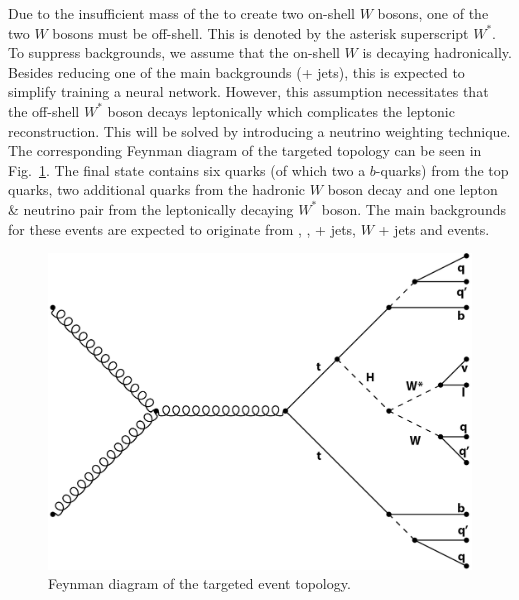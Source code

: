 \documentclass[bachelor,ngerman,english]{GAUBM}
\begin{document}
Due to the insufficient mass of the \Hboson to create two on-shell $W$ bosons, one of the two $W$ bosons must be off-shell. This is denoted by the asterisk superscript $W^*$. To suppress backgrounds, we assume that the on-shell $W$ is decaying hadronically. Besides reducing one of the main backgrounds (\ttbar + jets), this is expected to simplify training a neural network. However, this assumption necessitates that the off-shell $W^*$ boson decays leptonically which complicates the leptonic reconstruction. This will be solved by introducing a neutrino weighting technique.
The corresponding Feynman diagram of the targeted topology can be seen in Fig.~\ref{fig:feynman_tthww}. The final state contains six quarks (of which two a $b$-quarks) from the top quarks, two additional quarks from the hadronic $W$ boson decay and one lepton \& neutrino pair from the leptonically decaying $W^*$ boson. The main backgrounds for these events are expected to originate from \ttZ, \ttW, \ttbar + jets, $W$ + jets and \ttbar\ttbar events.


\begin{figure}[t]
    \centering
    \includegraphics[width=.61\textwidth]{figures/feynman/ttH_labeled.png}
    \caption{Feynman diagram of the targeted \ttHWW event topology.}
    \label{fig:feynman_tthww}
\end{figure}


\end{document}
